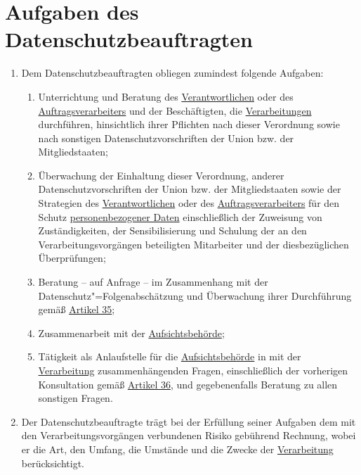 \chapter{Aufgaben des Datenschutzbeauftragten}
\label{ch:39}


\begin{enumerate}

  \item Dem Datenschutzbeauftragten obliegen zumindest folgende Aufgaben:%
  \label{itm:39-1}

  \begin{enumerate}
  
    \item Unterrichtung und Beratung des \hyperref[itm:04-7]{Verantwortlichen} oder des \hyperref[itm:04-8]
     {Auftragsverarbeiters} und der Beschäftigten, die
     \hyperref[itm:04-2]{Verarbeitungen} durchführen, hinsichtlich ihrer Pflichten nach dieser Verordnung sowie nach
      sonstigen Datenschutzvorschriften der Union bzw. der Mitgliedstaaten;%
    \label{itm:39-1a}

    \item Überwachung der Einhaltung dieser Verordnung, anderer Datenschutzvorschriften der Union bzw. der
     Mitgliedstaaten sowie der Strategien des \hyperref[itm:04-7]{Verantwortlichen} oder des \hyperref[itm:04-8]
     {Auftragsverarbeiters} für den Schutz
     \hyperref[itm:04-1]{personenbezogener Daten} einschließlich der Zuweisung von Zuständigkeiten, der Sensibilisierung
      und Schulung der an den Verarbeitungsvorgängen beteiligten Mitarbeiter und der diesbezüglichen Überprüfungen;%
    \label{itm:39-1b}

    \item Beratung -- auf Anfrage -- im Zusammenhang mit der Datenschutz"=Folgenabschätzung und Überwachung ihrer
     Durchführung gemäß \hyperref[ch:35]{Artikel 35};%
    \label{itm:39-1c}

    \item Zusammenarbeit mit der \hyperref[itm:04-21]{Aufsichtsbehörde};%
    \label{itm:39-1d}

    \item Tätigkeit als Anlaufstelle für die \hyperref[itm:04-21]{Aufsichtsbehörde} in mit der \hyperref[itm:04-2]
     {Verarbeitung} zusammenhängenden Fragen, einschließlich der vorherigen Konsultation gemäß \hyperref[ch:36]
     {Artikel 36}, und gegebenenfalls Beratung zu allen sonstigen Fragen.%
    \label{itm:39-1e}

  \end{enumerate}

  \item Der Datenschutzbeauftragte trägt bei der Erfüllung seiner Aufgaben dem mit den Verarbeitungsvorgängen
   verbundenen Risiko gebührend Rechnung, wobei er die Art, den Umfang, die Umstände und die Zwecke der \hyperref
   [itm:04-2]{Verarbeitung} berücksichtigt.%
  \label{itm:39-e}

\end{enumerate}


